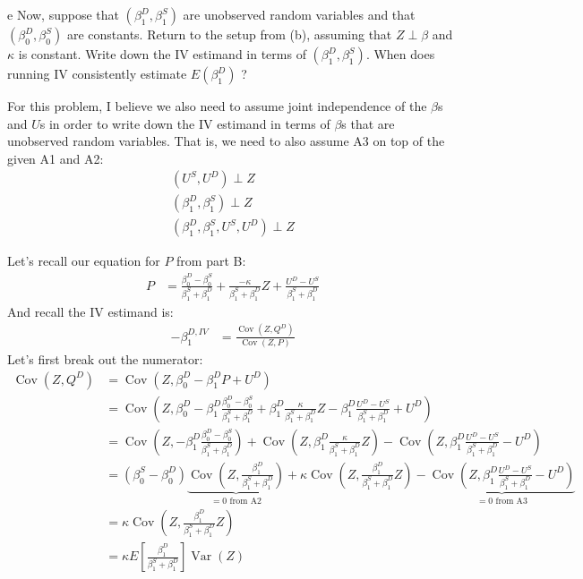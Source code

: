 \documentclass{article}
\begin{document}
\begin{problem}{e}
Now, suppose that $\left(\beta_{1}^{D}, \beta_{1}^{S}\right)$ are unobserved random variables and that $\left(\beta_{0}^{D}, \beta_{0}^{S}\right)$ are constants. Return to the setup from (b), assuming that $Z \perp \beta$ and $\kappa$ is constant. Write down the IV estimand in terms of $\left(\beta_{1}^{D}, \beta_{1}^{S}\right)$. When does running IV consistently estimate $E\left(\beta_{1}^{D}\right)$ ?
\end{problem}
\begin{solution}
For this problem, I believe we also need to assume joint independence of the $\beta$s and $U$s in order to write down the IV estimand in terms of $\beta$s that are unobserved random variables. That is, we need to also assume A3 on top of the given A1 and A2: 
\begin{align}
    (U^S,U^D) \perp Z \tag{A1} \\
    (\beta_1^D,\beta_1^S) \perp Z \tag{A2} \\
    (\beta_1^D,\beta_1^S,U^S,U^D) \perp Z \tag{A3}
\end{align}

Let's recall our equation for $P$ from part B:
\begin{align*}
    P &= \frac{\beta_{0}^{D} - \beta_{0}^{S}}{\beta_1^S+\beta_1^D} + \frac{ - \kappa}{\beta_1^S+\beta_1^D} Z + \frac{U^D - U^S}{\beta_1^S+\beta_1^D}    
\end{align*}
And recall the IV estimand is:
\begin{align*}
    -\beta_1^{D,IV} &= \frac{\operatorname{Cov}(Z,Q^D)}{\operatorname{Cov}(Z,P)}
\end{align*}
Let's first break out the numerator:
\begin{align*}
    \operatorname{Cov}(Z,Q^D) &= \operatorname{Cov}\left(Z, \beta_{0}^{D}-\beta_{1}^{D} P+U^{D}  \right) \tag{Plug in for $Q^D$} \\ 
    &= \operatorname{Cov}\left(Z, \beta_{0}^{D}-\beta_{1}^{D} \frac{\beta_{0}^{D} - \beta_{0}^{S}}{\beta_1^S+\beta_1^D} + \beta_1^D \frac{\kappa}{\beta_1^S+\beta_1^D} Z - \beta_1^D \frac{U^D - U^S}{\beta_1^S+\beta_1^D} + U^{D}  \right) \tag{Plug in for $P$} \\
    &= \operatorname{Cov}\left(Z, -\beta_{1}^{D} \frac{\beta_{0}^{D} - \beta_{0}^{S}}{\beta_1^S+\beta_1^D} \right) + \operatorname{Cov}\left(Z,\beta_1^D \frac{\kappa}{\beta_1^S+\beta_1^D} Z \right) - \operatorname{Cov}\left(Z, \beta_1^D \frac{U^D - U^S}{\beta_1^S+\beta_1^D} - U^{D}  \right) \\
    &= (\beta_{0}^{S} - \beta_{0}^{D})\underbrace{\operatorname{Cov}\left(Z,  \frac{\beta_{1}^{D}}{\beta_1^S+\beta_1^D} \right)}_\text{$=0$ from A2} + \kappa \operatorname{Cov}\left(Z, \frac{\beta_1^D}{\beta_1^S+\beta_1^D} Z \right) - \underbrace{\operatorname{Cov}\left(Z, \beta_1^D \frac{U^D - U^S}{\beta_1^S+\beta_1^D} - U^{D}  \right)}_\text{$=0$ from A3} \\
    &=  \kappa \operatorname{Cov}\left(Z, \frac{\beta_1^D}{\beta_1^S+\beta_1^D} Z \right) \\
    &=  \kappa E\left [ \frac{\beta_1^D}{\beta_1^S+\beta_1^D} \right] \operatorname{Var}(Z)  \tag{From A2}
\end{align*}


\end{solution}
\end{document}
